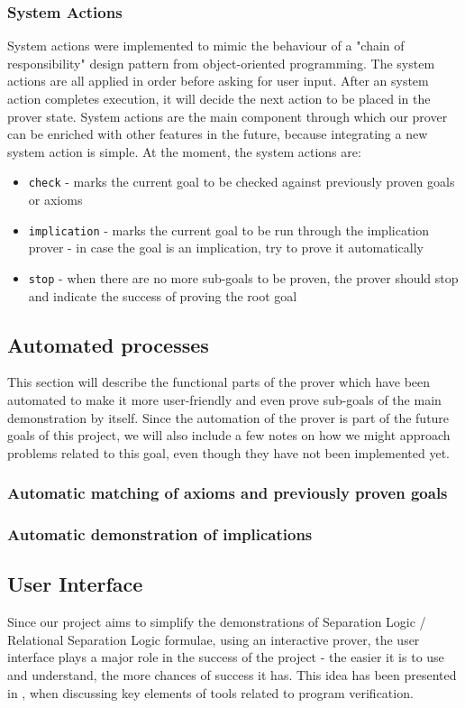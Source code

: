 \documentclass[12pt,a4paper]{article}
\begin{document}
{\subsubsection{System Actions}
System actions were implemented to mimic the behaviour of a "chain of responsibility" design pattern from object-oriented programming. The system actions are all applied in order before asking for user input. After an system action completes execution, it will decide the next action to be placed in the prover state. System actions are the main component through which our prover can be enriched with other features in the future, because integrating a new system action is simple. At the moment, the system actions are:
\begin{itemize}
	\item {\texttt{check}} - marks the current goal to be checked against previously proven goals or axioms
	\item {\texttt{implication}} - marks the current goal to be run through the implication prover - in case the goal is an implication, try to prove it automatically
	\item {\texttt{stop}} - when there are no more sub-goals to be proven, the prover should stop and indicate the success of proving the root goal
\end{itemize}
\subsection{Automated processes}
This section will describe the functional parts of the prover which have been automated to make it more user-friendly and even prove sub-goals of the main demonstration by itself. Since the automation of the prover is part of the future goals of this project, we will also include a few notes on how we might approach problems related to this goal, even though they have not been implemented yet.
\subsubsection{Automatic matching of axioms and previously proven goals}
\subsubsection{Automatic demonstration of implications}
\subsection{User Interface}
Since our project aims to simplify the demonstrations of Separation Logic / Relational Separation Logic formulae, using an interactive prover, the user interface plays a major role in the success of the project - the easier it is to use and understand, the more chances of success it has. This idea has been presented in \cite{primer}, when discussing key elements of tools related to program verification. \\

}
\end{document}
